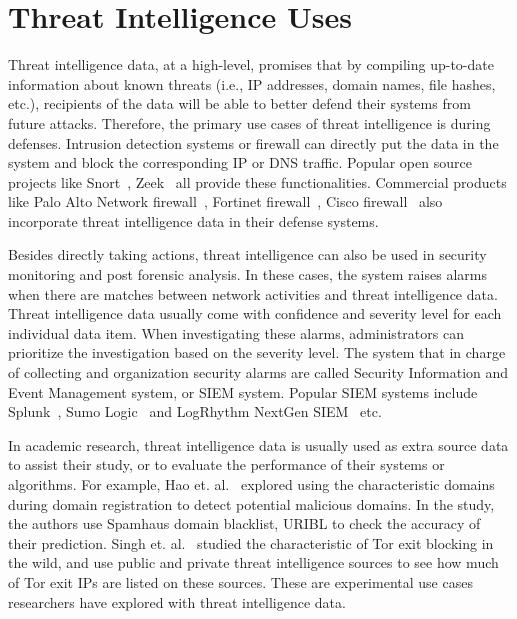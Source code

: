 \section{Threat Intelligence Uses}

Threat intelligence data, at a high-level, promises that by compiling up-to-date 
information about known threats (i.e., IP addresses, domain names, file hashes, 
etc.), recipients of the data will be able to better defend their systems from 
future attacks. Therefore, the primary use cases of threat intelligence is 
during defenses. Intrusion detection systems or firewall can directly put 
the data in the system and block the corresponding IP or DNS traffic. Popular 
open source projects like Snort~\cite{snortids}, Zeek~\cite{zeekids} all provide 
these functionalities. Commercial products like Palo Alto Network
firewall~\cite{paloaltofirewall}, Fortinet firewall~\cite{fortinetfirewall}, 
Cisco firewall~\cite{ciscofirewall} also incorporate threat intelligence data in 
their defense systems. 

Besides directly taking actions, threat intelligence can also be used in security
monitoring and post forensic analysis. In these cases, the system raises alarms
when there are matches between network activities and threat intelligence data.
Threat intelligence data usually come with confidence and severity level for each
individual data item. When investigating these alarms, administrators can 
prioritize the investigation based on the severity level. The system that in 
charge of collecting and organization security alarms are called Security 
Information and Event Management system, or SIEM system. Popular SIEM systems
include Splunk~\cite{splunk}, Sumo Logic~\cite{sumologic} and LogRhythm NextGen 
SIEM~\cite{logrhythm} etc.

In academic research, threat intelligence data is usually used as extra source 
data to assist their study, or to evaluate the performance of their systems or
algorithms. For example, Hao et. al.~\cite{hao2016predator} explored using the
characteristic domains during domain registration to detect potential malicious
domains. In the study, the authors use Spamhaus domain blacklist, URIBL to check 
the accuracy of their prediction. Singh et. al.~\cite{singh2017characterizing} 
studied the characteristic of Tor exit blocking in the wild, and use public and
private threat intelligence sources to see how much of Tor exit IPs are listed
on these sources. These are experimental use cases researchers have explored 
with threat intelligence data. 

